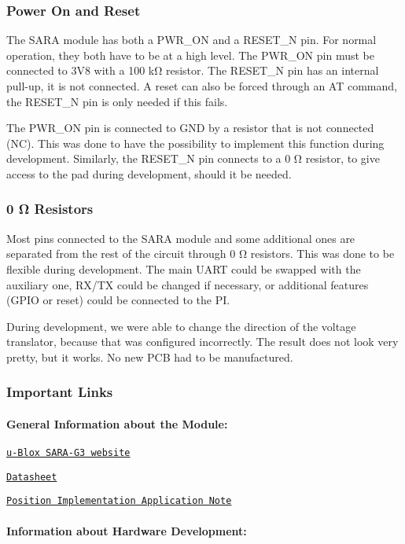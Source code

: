 \subsubsection*{Power On and Reset}

The S\+A\+RA module has both a P\+W\+R\+\_\+\+ON and a R\+E\+S\+E\+T\+\_\+N pin. For normal operation, they both have to be at a high level. The P\+W\+R\+\_\+\+ON pin must be connected to 3\+V8 with a 100 kΩ resistor. The R\+E\+S\+E\+T\+\_\+N pin has an internal pull-\/up, it is not connected. A reset can also be forced through an AT command, the R\+E\+S\+E\+T\+\_\+N pin is only needed if this fails.

The P\+W\+R\+\_\+\+ON pin is connected to G\+ND by a resistor that is not connected (NC). This was done to have the possibility to implement this function during development. Similarly, the R\+E\+S\+E\+T\+\_\+N pin connects to a 0 Ω resistor, to give access to the pad during development, should it be needed.

\subsubsection*{0 Ω Resistors}

Most pins connected to the S\+A\+RA module and some additional ones are separated from the rest of the circuit through 0 Ω resistors. This was done to be flexible during development. The main U\+A\+RT could be swapped with the auxiliary one, R\+X/\+TX could be changed if necessary, or additional features (G\+P\+IO or reset) could be connected to the PI.

During development, we were able to change the direction of the voltage translator, because that was configured incorrectly. The result does not look very pretty, but it works. No new P\+CB had to be manufactured.

 

\subsubsection*{Important Links}

\paragraph*{General Information about the Module\+:}


\begin{DoxyItemize}
\item \href{https://www.u-blox.com/en/product/sara-g3-series}{\tt u-\/\+Blox S\+A\+R\+A-\/\+G3 website}
\item \href{https://www.u-blox.com/en/docs/UBX-13000993}{\tt Datasheet}
\item \href{https://www.u-blox.com/sites/default/files/GNSS-Implementation_AppNote_%28UBX-13001849%29.pdf}{\tt Position Implementation Application Note} \paragraph*{Information about Hardware Development\+:}
\end{DoxyItemize}


